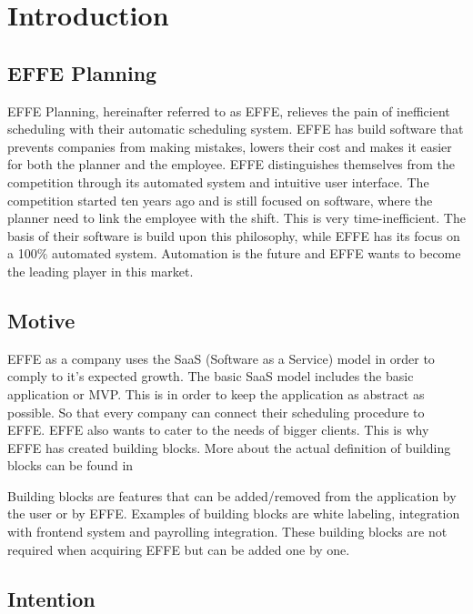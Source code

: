 \chapter{Introduction}

\section{EFFE Planning}
EFFE Planning, hereinafter referred to as EFFE, relieves the pain of inefficient scheduling with their automatic scheduling system. EFFE has build software that prevents companies from making mistakes, lowers their cost and makes it easier for both the planner and the employee. EFFE distinguishes themselves from the competition through its automated system and intuitive user interface. The competition started ten years ago and is still focused on software, where the planner need to link the employee with the shift. This is very time-inefficient. The basis of their software is build upon this philosophy, while EFFE has its focus on a 100\% automated system. Automation is the future and EFFE wants to become the leading player in this market.

\section{Motive}
EFFE as a company uses the SaaS (Software as a Service) model in order to comply to it’s expected growth. The basic SaaS model includes the basic application or MVP. This is in order to keep the application as abstract as possible. So that every company can connect their scheduling procedure to EFFE. EFFE also wants to cater to the needs of bigger clients. This is why EFFE has created building blocks. More about the actual definition of building blocks can be found in 

Building blocks are features that can be added/removed from the application by the user or by EFFE. Examples of building blocks are white labeling, integration with frontend system and payrolling integration. These building blocks are not required when acquiring EFFE but can be added one by one.

\section{Intention}
\label{sec:Intention}

